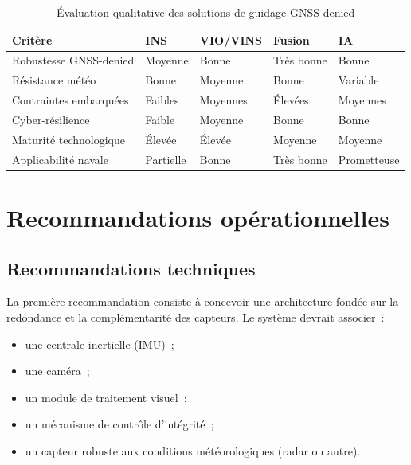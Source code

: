 \documentclass[12pt, a4paper, twoside, openright]{report}
\begin{document}
\begin{table}[H]
\centering
\caption{Évaluation qualitative des solutions de guidage GNSS-denied}
\label{tab:evaluation}
\begin{tabularx}{\textwidth}{lXXXX}
\toprule
\textbf{Critère} & \textbf{INS} & \textbf{VIO/VINS} & \textbf{Fusion} & \textbf{IA} \\
\midrule
Robustesse GNSS-denied & Moyenne & Bonne & Très bonne & Bonne \\
Résistance météo & Bonne & Moyenne & Bonne & Variable \\
Contraintes embarquées & Faibles & Moyennes & Élevées & Moyennes \\
Cyber-résilience & Faible & Moyenne & Bonne & Bonne \\
Maturité technologique & Élevée & Élevée & Moyenne & Moyenne \\
Applicabilité navale & Partielle & Bonne & Très bonne & Prometteuse \\
\bottomrule
\end{tabularx}
\end{table}

\cleardoublepage

\chapter{Recommandations opérationnelles}\label{chap:recommandations}

\section{Recommandations techniques}

La première recommandation consiste à concevoir une architecture fondée sur la redondance et la complémentarité des capteurs. Le système devrait associer~:

\begin{itemize}
    \item une centrale inertielle (IMU)~;
    \item une caméra~;
    \item un module de traitement visuel~;
    \item un mécanisme de contrôle d'intégrité~;
    \item un capteur robuste aux conditions météorologiques (radar ou autre).
\end{itemize}
\end{document}
